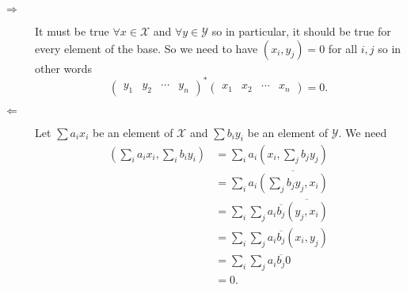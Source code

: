 \begin{solution}
  \begin{description}
    \item[$\Rightarrow$]
      It must be true $\forall x \in \mathcal{X}$ and $\forall y \in \mathcal{Y}$ so in particular,
      it should be true for every element of the base.
      So we need to have $(x_i,y_j) = 0$ for all $i,j$ so in other words
      \[
        \begin{pmatrix}
          y_1 & y_2 & \cdots & y_n
        \end{pmatrix}^*
        \begin{pmatrix}
          x_1 & x_2 & \cdots & x_n
        \end{pmatrix}
        = 0.
      \]
    \item[$\Leftarrow$]
      Let $\sum a_ix_i$ be an element of $\mathcal{X}$ and $\sum b_iy_i$ be an element of $\mathcal{Y}$.
      We need
      \begin{align*}
        (\sum_i a_ix_i, \sum_i b_iy_i)
        & = \sum_i a_i (x_i, \sum_j b_jy_j)\\
        & = \sum_i a_i \overline{(\sum_j b_jy_j, x_i)}\\
        & = \sum_i \sum_j a_i\overline{b_j} \overline{(y_j, x_i)}\\
        & = \sum_i \sum_j a_i\overline{b_j} (x_i, y_j)\\
        & = \sum_i \sum_j a_i \overline{b_j} 0\\
        & = 0.
      \end{align*}
  \end{description}
\end{solution}

